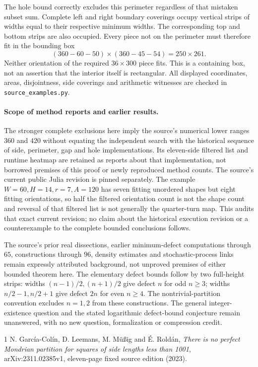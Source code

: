\documentclass[11pt]{article}
\begin{document}
The hole bound correctly excludes this perimeter regardless of that mistaken
subset sum. Complete left and right boundary coverings occupy vertical strips
of widths equal to their respective minimum widths. The corresponding top and
bottom strips are also occupied. Every piece not on the perimeter must therefore
fit in the bounding box
\[
 (360-60-50)\mathbin{\times}(360-45-54)=250\mathbin{\times}261.
\]
Neither orientation of the required $36\mathbin{\times}300$ piece fits.
This is a containing box, not an assertion that the interior itself is rectangular.
All displayed coordinates, areas, disjointness, side coverings and arithmetic
witnesses are checked in \texttt{source\_examples.py}.

\paragraph{Scope of method reports and earlier results.}
The stronger complete exclusions here imply the source's numerical lower ranges
$360$ and $420$ without equating the independent search with the historical
sequence of side, perimeter, gap and hole implementations. Its eleven-side
filtered list and runtime heatmap are retained as reports about that implementation,
not borrowed premises of this proof or newly reproduced method counts. The
source's current public Julia revision is pinned separately. The example
$W=60,H=14,r=7,A=120$ has seven fitting unordered shapes but eight fitting
orientations, so half the filtered orientation count is not the shape count and
reversal of that filtered list is not generally the quarter-turn map. This audits
that exact current revision; no claim about the historical execution revision
or a counterexample to the complete bounded conclusions follows.

The source's prior real dissections, earlier minimum-defect computations through
$65$, constructions through $96$, density estimates and stochastic-process links
remain expressly attributed background, not unproved premises of either bounded
theorem here. The elementary defect bounds follow by two full-height strips:
widths $(n-1)/2,(n+1)/2$ give defect $n$ for odd $n\ge3$; widths $n/2-1,n/2+1$
give defect $2n$ for even $n\ge4$. The nontrivial-partition convention excludes
$n=1,2$ from these constructions. The general integer-existence question and the
stated logarithmic defect-bound conjecture remain unanswered, with no new
question, formalization or compression credit.

\begin{thebibliography}{1}
 N. Garc\'ia-Col\'in, D. Leemans, M. M\"u\ss ig and \'E. Rold\'an,
\emph{There is no perfect Mondrian partition for squares of side lengths less
than 1001}, arXiv:2311.02385v1, eleven-page fixed source edition (2023).
\end{thebibliography}
\end{document}
